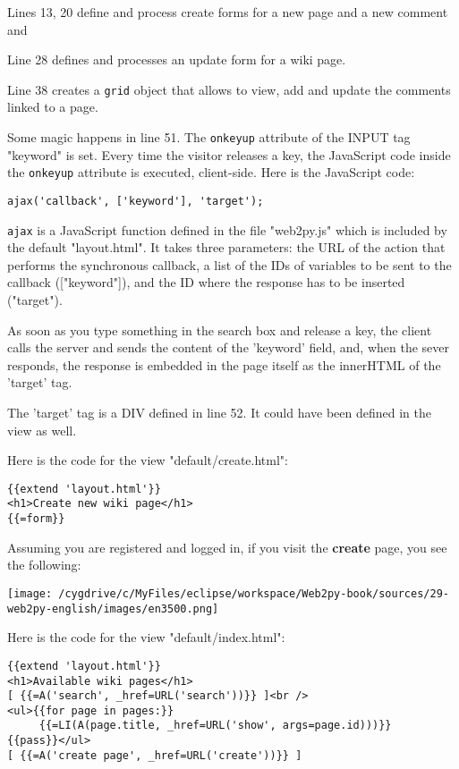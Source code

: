 \documentclass[justified,sixbynine,notoc]{tufte-book}
\def\ft{\small\tt}
\begin{document}
\begin{fullwidth}
Lines 13, 20 define and process create forms for a new page and a new comment and

Line 28 defines and processes an update form for a wiki page.

Line 38 creates a {\ft grid} object that allows to view, add and update the comments linked to a page.

Some magic happens in line 51. The {\ft onkeyup} attribute of the INPUT tag "keyword" is set. Every time the visitor releases a key, the JavaScript code inside the {\ft onkeyup} attribute is executed, client-side. Here is the JavaScript code:
\begin{lstlisting}
ajax('callback', ['keyword'], 'target');
\end{lstlisting}
{\ft ajax} is a JavaScript function defined in the file "web2py.js" which is included by the default "layout.html". It takes three parameters: the URL of the action that performs the synchronous callback, a list of the IDs of variables to be sent to the callback (["keyword"]), and the ID where the response has to be inserted ("target").

As soon as you type something in the search box and release a key, the client calls the server and sends the content of the 'keyword' field, and, when the sever responds, the response is embedded in the page itself as the innerHTML of the 'target' tag.

The 'target' tag is a DIV defined in line 52. It could have been defined in the view as well.

Here is the code for the view "default/create.html":
\begin{lstlisting}[keywords={}]
{{extend 'layout.html'}}
<h1>Create new wiki page</h1>
{{=form}}
\end{lstlisting}

Assuming you are registered and logged in, if you visit the {\bf create} page, you see the following:


\goodbreak\begin{center}\texttt{[image: /cygdrive/c/MyFiles/eclipse/workspace/Web2py-book/sources/29-web2py-english/images/en3500.png]}\end{center}


Here is the code for the view "default/index.html":
\begin{lstlisting}[keywords={}]
{{extend 'layout.html'}}
<h1>Available wiki pages</h1>
[ {{=A('search', _href=URL('search'))}} ]<br />
<ul>{{for page in pages:}}
     {{=LI(A(page.title, _href=URL('show', args=page.id)))}}
{{pass}}</ul>
[ {{=A('create page', _href=URL('create'))}} ]
\end{lstlisting}


\end{fullwidth}
\end{document}
